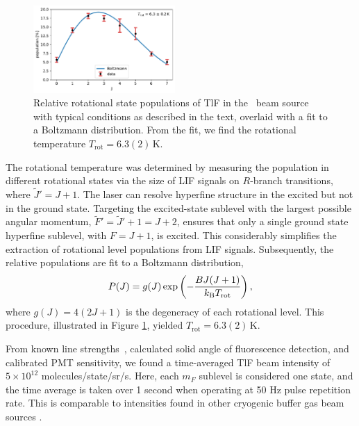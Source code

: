 \begin{figure}
	\centering
	\includegraphics[width=0.48\textwidth,unit=1mm]{figs/matplotlib/rotational_temperature.pdf}
	\caption{Relative rotational state populations of TlF in the \CENTREX\ beam source with typical conditions as described in the text, overlaid with a fit to a Boltzmann distribution. From the fit, we find the rotational temperature $T_\mathrm{rot} = 6.3(2)$\,K.}
	\label{fig:rotational_temperature}
\end{figure}
The rotational temperature was determined by measuring the population in different rotational states via the size of LIF signals on $R$-branch transitions, where $\widetilde{J}' = J+1$.  The laser can resolve hyperfine structure in the excited but not in the ground state. Targeting the excited-state sublevel with the largest possible angular momentum, $\widetilde{F}' = \widetilde{J}'+ 1 = J+2$, ensures that only a single ground state hyperfine sublevel, with $F=J+1$, is excited. This considerably simplifies the extraction of rotational level populations from LIF signals. Subsequently, the relative populations are fit to a Boltzmann distribution,
\begin{equation}
    P(J)= g(J)\exp\left(-\frac{BJ(J+1)}{k_\text{B} T_\text{rot}}\right),
\end{equation}
where $g(J) = 4(2J+1)$ is the degeneracy of each rotational level. This procedure, illustrated in Figure \ref{fig:rotational_temperature}, yielded $T_\mathrm{rot} = 6.3(2)$\,K. 

From known line strengths~\cite{norrgard2017hyperfine,PhysRevA.101.042506,clayburn2020measurement}, calculated solid angle of fluorescence detection, and calibrated PMT sensitivity, we found a time-averaged TlF beam intensity of $5\times 10^{12}$ molecules/state/sr/s. Here, each $m_F$ sublevel is considered one state, and the time average is taken over 1 second when operating at 50 Hz pulse repetition rate. This is comparable to intensities found in other cryogenic buffer gas beam sources \cite{hutzler2012buffer}.

